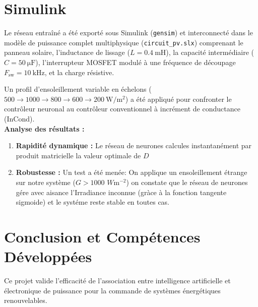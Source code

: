 \documentclass[11pt,a4paper]{article}
\begin{document}
\section{Simulink}

Le réseau entraîné a été exporté sous Simulink (\texttt{gensim}) et interconnecté dans le modèle de puissance complet multiphysique (\texttt{circuit\_pv.slx}) comprenant le panneau solaire, l'inductance de lissage ($L = \SI{0.4}{\milli\henry}$), la capacité intermédiaire ($C = \SI{50}{\micro\farad}$), l'interrupteur MOSFET modulé à une fréquence de découpage $F_{\mathrm{sw}} = \SI{10}{\kilo\hertz}$, et la charge résistive.

Un profil d'ensoleillement variable en échelons ($500 \to 1000 \to 800 \to 600 \to \SI{200}{\watt\per\meter\squared}$) a été appliqué pour confronter le contrôleur neuronal au contrôleur conventionnel à incrément de conductance (InCond).
 \\

\noindent\textbf{Analyse des résultats :}
\begin{enumerate}
    \item \textbf{Rapidité dynamique :} Le réseau de neurones calcules instantanément par produit matricielle la valeur optimale de $D$ 
    \item \textbf{Robustesse   :} Un test a été menée: On applique un ensoleillement étrange sur notre système ($G > 1000$ $ W \text{m}^{-2}$) on constate que le réseau de neurones gére avec aisance l'Irradiance inconnue (gràce à la fonction tangente sigmoide) et le systéme reste stable en toutes cas. 

\end{enumerate}
 
\section{Conclusion et Compétences Développées}

Ce projet valide l'efficacité de l'association entre intelligence artificielle et électronique de puissance pour la commande de systèmes énergétiques renouvelables. 
\end{document}

